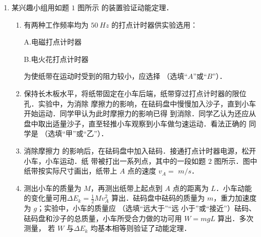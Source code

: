 \begin{enumerate}
\renewcommand{\labelenumi}{\arabic{enumi}.}
\item
{}
某兴趣小组用如题 $ 1 $ 图所示 的装置验证动能定理．
\begin{figure}[h!]
\centering

\end{figure}

\begin{enumerate}
\renewcommand{\labelenumi}{\arabic{enumi}.}
\item
有两种工作频率均为 $ 50 \ Hz $ 的打点计时器供实验选用：

A.电磁打点计时器

B.电火花打点计时器


为使纸带在运动时受到的阻力较小，应选择  （选填“$ A $”或“$ B $”）．

\item 
保持长木板水平，将纸带固定在小车后端，纸带穿过打点计时器的限位孔．实验中，为消除
摩擦力的影响，在砝码盘中慢慢加入沙子，直到小车开始运动．同学甲认为此时摩擦力的影响已得
到消除．同学乙认为还应从盘中取出适量沙子，直至轻推小车观察到小车做匀速运动．看法正确的
同学是  （选填“甲”或“乙”）．


\item 
消除摩擦力 的影响后，在砝码盘中加入砝码．接通打点计时器电源，松开小车，小车运动．纸
带被打出一系列点，其中的一段如题 $ 2 $ 图所示．图中纸带按实际尺寸画出，纸带上 $ A $ 点的速度
$ v_{A} =$  $m/s $．
\begin{figure}[h!]
\centering

\end{figure}


\item 
测出小车的质量为 $ M $，再测出纸带上起点到 $ A $ 点的距离为 $ L $．小车动能的变化量可用$ \Delta E_{k} = \frac{ 1 }{ 2 } M v_{A} ^{2} $
算出．砝码盘中砝码的质量为 $ m $，重力加速度为 $ g $；实验中，小车的质量应  （选填“远大于”“远
小于”或“接近”）砝码、砝码盘和沙子的总质量，小车所受合力做的功可用 $ W=mgL $ 算出．多次测量，
若 $ W $ 与$ \Delta E_{k} $ 均基本相等则验证了动能定理．



\end{enumerate}
\end{enumerate}
